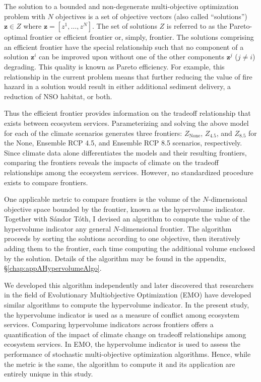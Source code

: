 The solution to a bounded and non-degenerate multi-objective optimization problem with $N$ objectives is a set of objective vectors (also called ``solutions'') $\mathbf{z} \in Z$ where $\mathbf{z}=[z^1,\ldots,z^N]$. The set of solutions $Z$ is referred to as the Pareto-optimal frontier or efficient frontier or, simply, frontier. The solutions comprising an efficient frontier have the special relationship such that no component of a solution $\mathbf{z}^i$ can be improved upon without one of the other components $\mathbf{z}^j$ ($j \neq i$) degrading. This quality is known as Pareto efficiency. For example, this relationship in the current problem means that further reducing the value of fire hazard in a solution would result in either additional sediment delivery, a reduction of NSO habitat, or both.

Thus the efficient frontier provides information on the tradeoff relationship that exists between ecosystem services. Parameterizing and solving the above model for each of the climate scenarios generates three frontiers: $Z_{\text{None}}$, $Z_{4.5}$, and $Z_{8.5}$ for the None, Ensemble RCP 4.5, and Ensemble RCP 8.5 scenarios, respectively. Since climate data alone differentiates the models and their resulting frontiers, comparing the frontiers reveals the impacts of climate on the tradeoff relationships among the ecosystem services. However, no standardized procedure exists to compare frontiers.

One applicable metric to compare frontiers is the volume of the $N$-dimensional objective space bounded by the frontier, known as the hypervolume indicator. Together with S\'{a}ndor T\'{o}th, I devised an algorithm to compute the value of the hypervolume indicator any general $N$-dimensional frontier. The algorithm proceeds by sorting the solutions according to one objective, then iteratively adding them to the frontier, each time computing the additional volume enclosed by the solution. Details of the algorithm may be found in the appendix, \S \ref{chap:appAHypervolumeAlgo}.

We developed this algorithm independently and later discovered that researchers in the field of Evolutionary Multiobjective Optimization (EMO) have developed similar algorithms to compute the hypervolume indicator. In the present study, the hypervolume indicator is used as a measure of conflict among ecosystem services. Comparing hypervolume indicators across frontiers offers a quantification of the impact of climate change on tradeoff relationships among ecosystem services. In EMO, the hypervolume indicator is used to assess the performance of stochastic multi-objective optimization algorithms. Hence, while the metric is the same, the algorithm to compute it and its application are entirely unique in this study.

